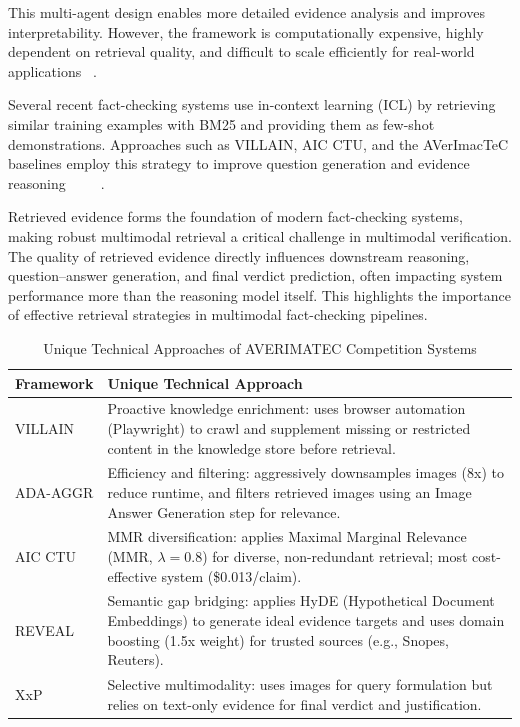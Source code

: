 This multi-agent design enables more detailed evidence analysis and improves interpretability. However, the framework is computationally expensive, highly dependent on retrieval quality, and difficult to scale efficiently for real-world applications ~\cite{Jung2026Mar}.

Several recent fact-checking systems use in-context learning (ICL) by retrieving similar training examples with BM25 and providing them as few-shot demonstrations. Approaches such as VILLAIN, AIC CTU, and the  AVerImacTeC baselines employ this strategy to improve question generation and evidence reasoning ~\cite{Jung2026Mar} ~\cite{Ullrich2026Mar} ~\cite{Cao2025May}.


Retrieved evidence forms the foundation of modern fact-checking systems, making robust multimodal retrieval a critical challenge in multimodal verification. The quality of retrieved evidence directly influences downstream reasoning, question–answer generation, and final verdict prediction, often impacting system performance more than the reasoning model itself. This highlights the importance of effective retrieval strategies in multimodal fact-checking pipelines.

\begin{table}[ht]
\centering
\caption{Unique Technical Approaches of AVERIMATEC Competition Systems}
\label{tab:competition-systems-unique-approaches}
\begin{tabular}{|l|p{10cm}|}
\hline
\textbf{Framework} & \textbf{Unique Technical Approach} \\
\hline
VILLAIN & Proactive knowledge enrichment: uses browser automation (Playwright) to crawl and supplement missing or restricted content in the knowledge store before retrieval. \\
ADA-AGGR & Efficiency and filtering: aggressively downsamples images (8x) to reduce runtime, and filters retrieved images using an Image Answer Generation step for relevance. \\
AIC CTU & MMR diversification: applies Maximal Marginal Relevance (MMR, $\lambda=0.8$) for diverse, non-redundant retrieval; most cost-effective system (\$0.013/claim). \\
REVEAL & Semantic gap bridging: applies HyDE (Hypothetical Document Embeddings) to generate ideal evidence targets and uses domain boosting (1.5x weight) for trusted sources (e.g., Snopes, Reuters). \\
XxP & Selective multimodality: uses images for query formulation but relies on text-only evidence for final verdict and justification. \\
\hline
\end{tabular}
\end{table}

